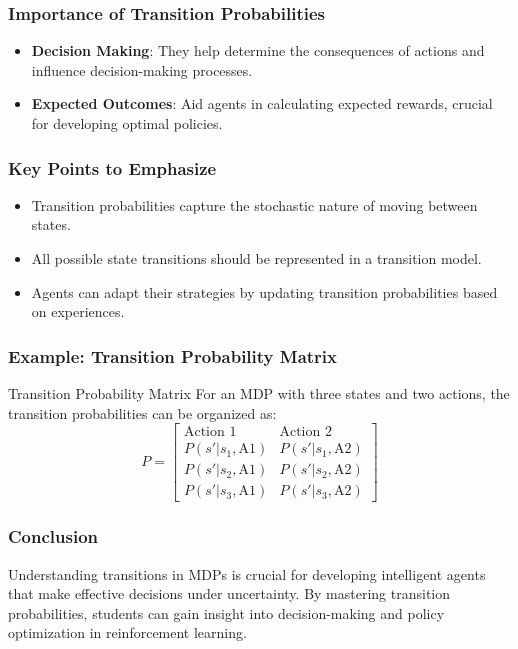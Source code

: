 \documentclass[aspectratio=169]{beamer}
\begin{document}
\begin{frame}[fragile]
    \frametitle{Importance of Transition Probabilities}
    \begin{itemize}
        \item \textbf{Decision Making}: They help determine the consequences of actions and influence decision-making processes.
        \item \textbf{Expected Outcomes}: Aid agents in calculating expected rewards, crucial for developing optimal policies.
    \end{itemize}
\end{frame}

\begin{frame}[fragile]
    \frametitle{Key Points to Emphasize}
    \begin{itemize}
        \item Transition probabilities capture the stochastic nature of moving between states.
        \item All possible state transitions should be represented in a transition model.
        \item Agents can adapt their strategies by updating transition probabilities based on experiences.
    \end{itemize}
\end{frame}

\begin{frame}[fragile]
    \frametitle{Example: Transition Probability Matrix}
    \begin{block}{Transition Probability Matrix}
        For an MDP with three states and two actions, the transition probabilities can be organized as:
        \begin{equation}
            P = \begin{bmatrix}
            \text{Action 1} & \text{Action 2} \\
            P(s' | s_1, \text{A1}) & P(s' | s_1, \text{A2}) \\
            P(s' | s_2, \text{A1}) & P(s' | s_2, \text{A2}) \\
            P(s' | s_3, \text{A1}) & P(s' | s_3, \text{A2}) 
            \end{bmatrix}
        \end{equation}
    \end{block}
\end{frame}

\begin{frame}[fragile]
    \frametitle{Conclusion}
    Understanding transitions in MDPs is crucial for developing intelligent agents that make effective decisions under uncertainty. By mastering transition probabilities, students can gain insight into decision-making and policy optimization in reinforcement learning.
\end{frame}
\end{document}
